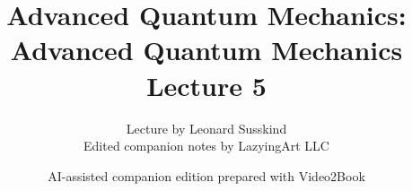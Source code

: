 \documentclass[11pt,oneside]{book}
\begin{document}
\frontmatter
\title{Advanced Quantum Mechanics: Advanced Quantum Mechanics Lecture 5}
\author{Lecture by Leonard Susskind\\Edited companion notes by LazyingArt LLC}
\date{AI-assisted companion edition prepared with Video2Book}
\maketitle
\clearpage
\mainmatter

\end{document}
